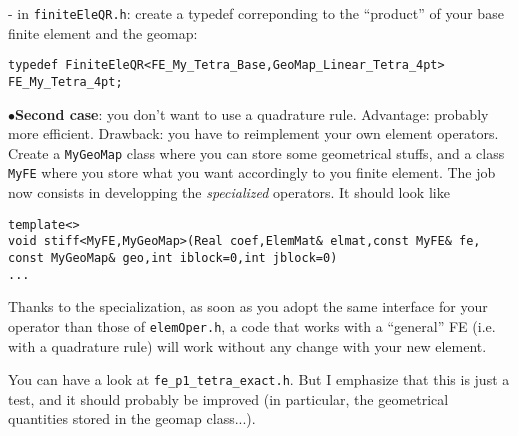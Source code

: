 - in \texttt{finiteEleQR.h}: create a typedef correponding to the
  ``product'' of your base finite element and the geomap:
\begin{verbatim}
typedef FiniteEleQR<FE_My_Tetra_Base,GeoMap_Linear_Tetra_4pt> FE_My_Tetra_4pt;
\end{verbatim}
  
  $\bullet${\bf Second case}: you don't want to use a quadrature rule.
  Advantage: probably more efficient. Drawback: you have to reimplement
  your own element operators. Create a \texttt{MyGeoMap} class where you
  can store some geometrical stuffs, and a class \texttt{MyFE} where you
  store what you want accordingly to you finite element. The job now
  consists in developping the \emph{specialized} operators. 
It should look like
\begin{verbatim}
template<>
void stiff<MyFE,MyGeoMap>(Real coef,ElemMat& elmat,const MyFE& fe,
const MyGeoMap& geo,int iblock=0,int jblock=0)
...

\end{verbatim}
Thanks to the specialization, as soon as you adopt the same interface
for your operator than those of \texttt{elemOper.h}, a code
that works with a ``general'' FE (i.e. with a quadrature rule)
will work without any change with your new element.

You can have a look at \verb#fe_p1_tetra_exact.h#. But I emphasize that 
this is just a test, and it should probably be improved (in particular,
the geometrical quantities stored in the geomap class...).


%
%
